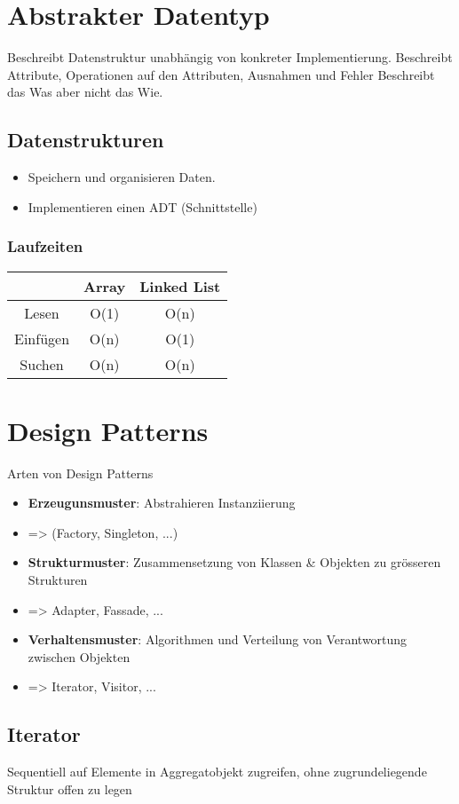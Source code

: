 \begin{multicols*}{5}
\section{Abstrakter Datentyp}
Beschreibt Datenstruktur unabhängig von konkreter Implementierung.
Beschreibt Attribute, Operationen auf den Attributen, Ausnahmen und Fehler
Beschreibt das Was aber nicht das Wie.

\subsection{Datenstrukturen}
	\begin{itemize}
		\item Speichern und organisieren Daten.
		\item Implementieren einen ADT (Schnittstelle)
	\end{itemize}

	\subsubsection{Laufzeiten}
		\renewcommand{\arraystretch}{1.1}
		\begin{tabular}{c | c | c}
			& Array & Linked List \\
			\hline
			Lesen & O(1) & O(n) \\
			Einfügen & O(n) & O(1)  \\
			Suchen & O(n) & O(n) \\
		\end{tabular}

\section{Design Patterns}
	Arten von Design Patterns
	\begin{itemize}
		\item \textbf{Erzeugunsmuster}: Abstrahieren Instanziierung 
		\item => (Factory, Singleton, ...)
		\item \textbf{Strukturmuster}: Zusammensetzung von Klassen \& Objekten zu grösseren Strukturen
		\item => Adapter, Fassade, ...
		\item \textbf{Verhaltensmuster}: Algorithmen und Verteilung von Verantwortung zwischen Objekten
		\item => Iterator, Visitor, ...
	\end{itemize}
	\subsection{Iterator}
	Sequentiell auf Elemente in Aggregatobjekt zugreifen, ohne zugrundeliegende Struktur offen zu legen
	

\end{multicols*}
